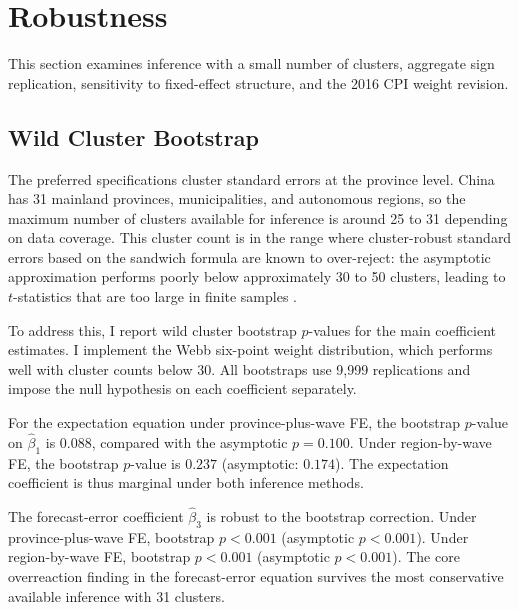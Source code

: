 
\section{Robustness}\label{sec:robustness}

This section examines inference with a small number of clusters,
aggregate sign replication, sensitivity to fixed-effect structure,
and the 2016 CPI weight revision.

\subsection{Wild Cluster Bootstrap}\label{sec:wcb}

The preferred specifications cluster standard errors at the
province level.
China has 31 mainland provinces, municipalities, and autonomous
regions, so the maximum number of clusters available for
inference is around 25 to 31 depending on data coverage.
This cluster count is in the range where cluster-robust
standard errors based on the sandwich formula are known to
over-reject: the asymptotic approximation performs poorly
below approximately 30 to 50 clusters, leading to
$t$-statistics that are too large in finite samples
\citep{Cameron2008, MacKinnon2017}.

To address this, I report wild cluster bootstrap $p$-values
for the main coefficient estimates.
I implement the Webb six-point weight distribution, which
performs well with cluster counts below 30.
All bootstraps use 9,999 replications and impose the null
hypothesis on each coefficient separately.

For the expectation equation under province-plus-wave FE,
the bootstrap $p$-value on $\hat{\beta}_1$ is $0.088$,
compared with the asymptotic $p = 0.100$.
Under region-by-wave FE, the bootstrap $p$-value is $0.237$
(asymptotic: $0.174$).
The expectation coefficient is thus marginal under both
inference methods.

The forecast-error coefficient $\hat{\beta}_3$ is robust
to the bootstrap correction.
Under province-plus-wave FE, bootstrap $p < 0.001$
(asymptotic $p < 0.001$).
Under region-by-wave FE, bootstrap $p < 0.001$
(asymptotic $p < 0.001$).
The core overreaction finding in the forecast-error equation
survives the most conservative available inference with
31 clusters.

